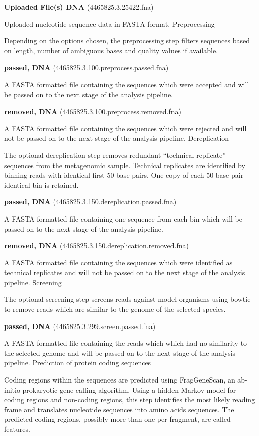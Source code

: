 \documentclass[12pt,fullpage]{report}
\begin{document}
\begin{mdframed}
\textbf{Uploaded File(s) DNA} (4465825.3.25422.fna)

Uploaded nucleotide sequence data in FASTA format.
Preprocessing

Depending on the options chosen, the preprocessing step filters sequences based on length, number of ambiguous bases and quality values if available.

\textbf{passed, DNA} (4465825.3.100.preprocess.passed.fna)

A FASTA formatted file containing the sequences which were accepted and will be passed on to the next stage of the analysis pipeline.

\textbf{removed, DNA} (4465825.3.100.preprocess.removed.fna)

A FASTA formatted file containing the sequences which were rejected and will not be passed on to the next stage of the analysis pipeline.
Dereplication

The optional dereplication step removes redundant “technical replicate” sequences from the metagenomic sample. Technical replicates are identified by binning reads with identical first 50 base-pairs. One copy of each 50-base-pair identical bin is retained.

\textbf{passed, DNA} (4465825.3.150.dereplication.passed.fna)

A FASTA formatted file containing one sequence from each bin which will be passed on to the next stage of the analysis pipeline.

\textbf{removed, DNA} (4465825.3.150.dereplication.removed.fna)

A FASTA formatted file containing the sequences which were identified as technical replicates and will not be passed on to the next stage of the analysis pipeline.
Screening

The optional screening step screens reads against model organisms using bowtie to remove reads which are similar to the genome of the selected species.

\textbf{passed, DNA} (4465825.3.299.screen.passed.fna)

A FASTA formatted file containing the reads which which had no similarity to the selected genome and will be passed on to the next stage of the analysis pipeline.
Prediction of protein coding sequences

Coding regions within the sequences are predicted using FragGeneScan, an ab-initio prokaryotic gene calling algorithm. Using a hidden Markov model for coding regions and non-coding regions, this step identifies the most likely reading frame and translates nucleotide sequences into amino acids sequences. The predicted coding regions, possibly more than one per fragment, are called features.


\end{mdframed}
\end{document}
